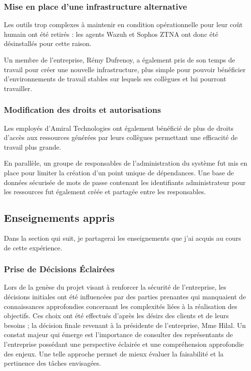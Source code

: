 \subsubsection{Mise en place d'une infrastructure alternative}
Les outils trop complexes à maintenir en condition opérationnelle pour leur coût humain ont été retirés : les agents Wazuh et Sophos ZTNA ont donc été désinstallés pour cette raison.

Un membre de l'entreprise, Rémy Dufrenoy, a également pris de son temps de travail pour créer une nouvelle infrastructure, plus simple pour pouvoir bénéficier d'environnements de travail stables sur lequels ses collègues et lui pourront travailler.

\subsubsection{Modification des droits et autorisations}
Les employés d'Amiral Technologies ont également bénéficié de plus de droits d'accès aux ressources générées par leurs collègues permettant une efficacité de travail plus grande.

En parallèle, un groupe de responsables de l'administration du système fut mis en place pour limiter la création d'un point unique de dépendances.
Une base de données sécurisée de mots de passe contenant les identifiants administrateur pour les ressources fut également créée et partagée entre les responsables.

\subsection{Enseignements appris}
Dans la section qui suit, je partagerai les enseignements que j'ai acquis au cours de cette expérience.
\subsubsection{Prise de Décisions Éclairées}



Lors de la genèse du projet visant à renforcer la sécurité de l'entreprise, les décisions initiales ont été influencées par des parties prenantes qui manquaient de connaissances approfondies concernant les complexités liées à la réalisation des objectifs.
Ces choix ont été effectués d'après les désirs des clients et de leurs besoins ; la décision finale revenant à la présidente de l'entreprise, Mme Hilal.
Un constat majeur qui émerge est l'importance de consulter des représentants de l'entreprise possédant une perspective éclairée et une compréhension approfondie des enjeux.
Une telle approche permet de mieux évaluer la faisabilité et la pertinence des tâches envisagées.

